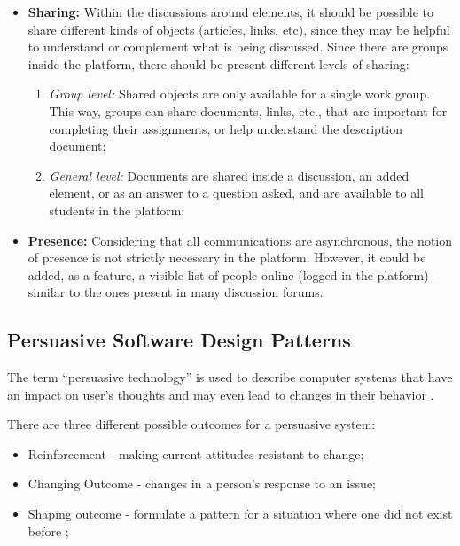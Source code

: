 \begin{itemize}
\item \textbf{Sharing:} Within the discussions around elements, it should be possible to share different kinds of objects (articles, links, etc), since they may be helpful to understand or complement what is being discussed. Since there are groups inside the platform, there should be present different levels of sharing:

\begin{enumerate}
\item \textit{Group level:} Shared objects are only available for a single work group. 
This way, groups can share documents, links, etc., that are important for completing their assignments, or help understand the description document;

\item \textit{General level:} Documents are shared inside a discussion, an added element, or as an answer to a question asked, and are available to all students in the platform;
\end{enumerate}


\item \textbf{Presence:} Considering that all communications are asynchronous, the notion of presence is not strictly necessary in the platform. 
However, it could be added, as a feature, a visible list of people online (logged in the platform) – similar to the ones present in many discussion forums.
\end{itemize}

\subsection{Persuasive Software Design Patterns}
The term ``persuasive technology'' is used to describe computer systems that have an impact on user's thoughts and may even lead to changes in their behavior \cite{fogg2002persuasive,oinas2009persuasive}.

There are three different possible outcomes for a persuasive system:

\begin{itemize}
\item Reinforcement - making current attitudes resistant to change;
\item Changing Outcome - changes in a person's response to an issue;
\item Shaping outcome - formulate a pattern for a situation where one did not exist before \cite{oinas2008towards};
\end{itemize}

